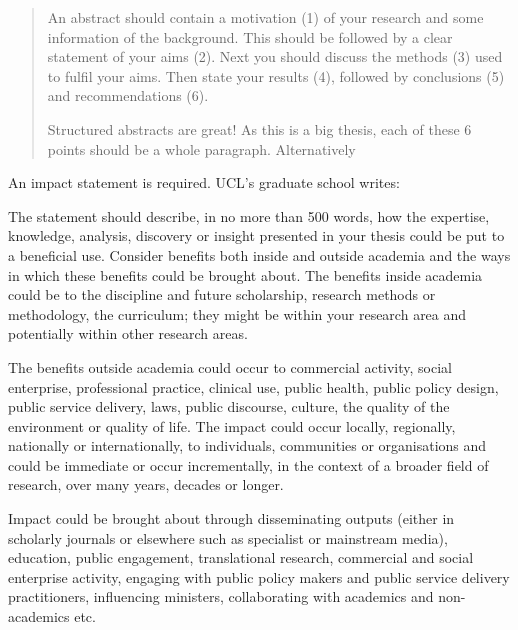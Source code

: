 {}
\begin{abstract}   

An abstract should contain a motivation (1) of your research and some information of the background.
This should be followed by a clear statement of your aims (2).
Next you should discuss the methods (3) used to fulfil your aims.
Then state your results (4), followed by conclusions (5) and recommendations (6). 

Structured abstracts are great! 
As this is a big thesis, each of these 6 points should be a whole paragraph.
Alternatively

\end{abstract}
\cleardoublepage

{}
\vspace*{3cm}
\begin{impact}

An impact statement is required.
UCL's graduate school writes:

\begin{displayquote}
The statement should describe, in no more than 500 words, how the expertise, knowledge, analysis, discovery or insight presented in your thesis could be put to a beneficial use.
Consider benefits both inside and outside academia and the ways in which these benefits could be brought about.
The benefits inside academia could be to the discipline and future scholarship, research methods or methodology, the curriculum; they might be within your research area and potentially within other research areas.

The benefits outside academia could occur to commercial activity, social enterprise, professional practice, clinical use, public health, public policy design, public service delivery, laws, public discourse, culture, the quality of the environment or quality of life.
The impact could occur locally, regionally, nationally or internationally, to individuals, communities or organisations and could be immediate or occur incrementally, in the context of a broader field of research, over many years, decades or longer.

Impact could be brought about through disseminating outputs (either in scholarly journals or elsewhere such as specialist or mainstream media), education, public engagement, translational research, commercial and social enterprise activity, engaging with public policy makers and public 
service delivery practitioners, influencing ministers, collaborating with academics and non-academics etc.
\end{displayquote}

\end{impact}
\cleardoublepage


